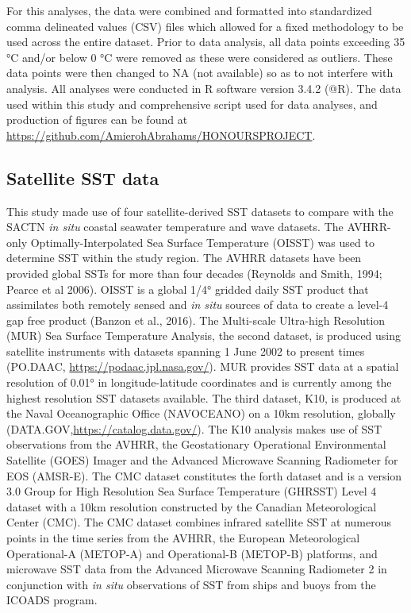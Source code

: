\documentclass[10pt,a4paper,]{article}
\begin{document}
For this analyses, the data were combined and formatted into
standardized comma delineated values (CSV) files which allowed for a
fixed methodology to be used across the entire dataset. Prior to data
analysis, all data points exceeding 35 °C and/or below 0 °C were removed
as these were considered as outliers. These data points were then
changed to NA (not available) so as to not interfere with analysis. All
analyses were conducted in R software version 3.4.2 (@R). The data used
within this study and comprehensive script used for data analyses, and
production of figures can be found at
\url{https://github.com/AmierohAbrahams/HONOURSPROJECT}.

\hypertarget{satellite-sst-data}{%
\subsection{Satellite SST data}\label{satellite-sst-data}}

This study made use of four satellite-derived SST datasets to compare
with the SACTN \emph{in situ} coastal seawater temperature and wave
datasets. The AVHRR-only Optimally-Interpolated Sea Surface Temperature
(OISST) was used to determine SST within the study region. The AVHRR
datasets have been provided global SSTs for more than four decades
(Reynolds and Smith, 1994; Pearce et al 2006). OISST is a global 1/4°
gridded daily SST product that assimilates both remotely sensed and
\emph{in situ} sources of data to create a level-4 gap free product
(Banzon et al., 2016). The Multi-scale Ultra-high Resolution (MUR) Sea
Surface Temperature Analysis, the second dataset, is produced using
satellite instruments with datasets spanning 1 June 2002 to present
times (PO.DAAC, \url{https://podaac.jpl.nasa.gov/}). MUR provides SST
data at a spatial resolution of 0.01° in longitude-latitude coordinates
and is currently among the highest resolution SST datasets available.
The third dataset, K10, is produced at the Naval Oceanographic Office
(NAVOCEANO) on a 10km resolution, globally
(DATA.GOV,\url{https://catalog.data.gov/}). The K10 analysis makes use
of SST observations from the AVHRR, the Geostationary Operational
Environmental Satellite (GOES) Imager and the Advanced Microwave
Scanning Radiometer for EOS (AMSR-E). The CMC dataset constitutes the
forth dataset and is a version 3.0 Group for High Resolution Sea Surface
Temperature (GHRSST) Level 4 dataset with a 10km resolution constructed
by the Canadian Meteorological Center (CMC). The CMC dataset combines
infrared satellite SST at numerous points in the time series from the
AVHRR, the European Meteorological Operational-A (METOP-A) and
Operational-B (METOP-B) platforms, and microwave SST data from the
Advanced Microwave Scanning Radiometer 2 in conjunction with \emph{in
situ} observations of SST from ships and buoys from the ICOADS program.
\end{document}
